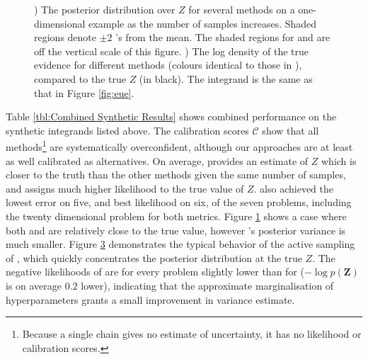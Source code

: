 \documentclass{article} %
\begin{document}
\begin{figure}
	\begin{subfigure}[b]{7.5cm}
		\caption{}
		\label{fig:se}
	\end{subfigure}
	\begin{subfigure}[b]{6cm}
		\caption{}
		\label{fig:nll}
	\end{subfigure}
	\caption{) The posterior distribution over $Z$ for several methods on a one-dimensional example as the number of samples increases.  Shaded regions denote $\pm2$ 's from the mean.  The shaded regions for  and  are off the vertical scale of this figure. ) The log density of the true evidence for different methods (colours identical to those in ), compared to the true $Z$ (in black).  The integrand is the same as that in Figure \ref{fig:eue}.}
\end{figure}

\begin{table}[h!]
\begin{minipage}[b]{0.5\linewidth}\centering

\end{minipage}
\begin{minipage}[b]{0.5\linewidth}\centering

\end{minipage}
%
\end{table}

Table \ref{tbl:Combined Synthetic Results} shows combined performance on the synthetic integrands listed above. The calibration scores $\mathcal{C}$ show that all methods\footnote{Because a single  chain gives no estimate of uncertainty, it has no likelihood or calibration scores.} are systematically overconfident, although our approaches are at least as well calibrated as alternatives. On average,  provides an estimate of $Z$ which is closer to the truth than the other methods given the same number of samples, and assigns much higher likelihood to the true value of $Z$.  also achieved the lowest error on five, and best likelihood on six, of the seven problems, including the twenty dimensional problem for both metrics.  Figure \ref{fig:se} shows a case where both
  and  are relatively close to the true value, however 's posterior variance is much smaller.  Figure \ref{fig:nll} demonstrates the typical behavior of the active sampling of , which quickly concentrates the posterior distribution at the true $Z$. The negative likelihoods of  are for every problem slightly lower than for  ($-\log p(\mathbf{Z})$ is on average $0.2$ lower), indicating that the approximate marginalisation of hyperparameters grants a small improvement in variance estimate. 
\end{document}
